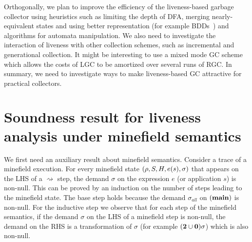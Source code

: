 \documentclass[9pt,nonatbib]{sigplanconf}
\begin{document}
  Orthogonally,   we   plan  to   improve   the   efficiency  of   the
  liveness-based garbage  collector using heuristics such  as limiting
  the depth of DFA, merging  nearly-equivalent states and using better
  representation (for example BDDs~\cite{Bryant86})  and algorithms for
  automata manipulation.  We also  need to investigate the interaction
  of liveness with  other collection schemes, such  as incremental and
  generational collection.   It might  be interesting  to use  a mixed
  mode GC  scheme which allows the  costs of LGC to  be amortized over
  several runs of RGC. In summary, we need to investigate ways to make
  liveness-based GC attractive for practical collectors.

\appendix
\section{Soundness result for liveness analysis under minefield semantics}
\label{sec:sound}
We first need an auxiliary  result about minefield semantics. Consider
a trace of  a minefield execution.  For every  minefield state $(\rho,
S,   H,  e(s),   \sigma)$   that   appears  on   the   LHS  of   a
$\rightsquigarrow$ step, the demand $\sigma$ on the expression $e$ (or
application $s$) is  non-null.  This can be proved by  an induction on
the number  of steps leading  to the  minefield state.  The  base step
holds   because  the   demand   $\sigma_{\mathit{all}}$   on  $(\mathbf{main})$   is
non-null. For the inductive step we  observe that for each step of the
minefield semantics, if the demand $\sigma$  on the LHS of a minefield
step  is non-null,  the  demand  on the  RHS  is  a transformation  of
$\sigma$ (for example $({\mathbf{2}}\cup\mathbf{0})\sigma$) which is also non-null.
\end{document}
